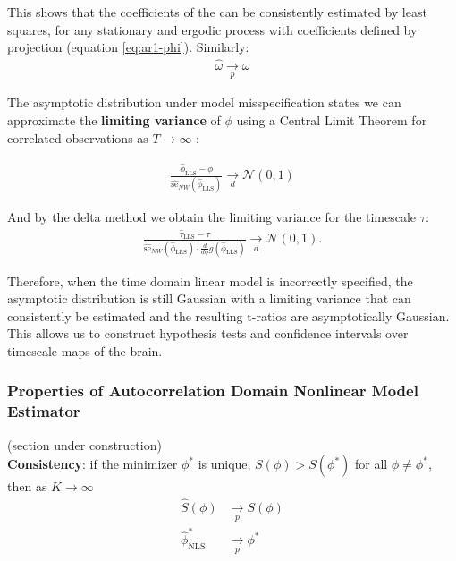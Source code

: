 \documentclass[main.tex]{subfiles}
\begin{document}
\noindent This shows that the coefficients of the  can be consistently estimated by least squares, for any stationary and ergodic process with coefficients defined by projection (equation \eqref{eq:ar1-phi}). Similarly:
\begin{align*}
    \hat \omega \underset{p}{\to} \omega
\end{align*}

The asymptotic distribution under model misspecification states we can approximate the \textbf{limiting variance} of $\phi$ using a Central Limit Theorem for correlated observations as $T\to\infty$ \citet[theorem~14.33]{hansen_econometrics_2022}:

\begin{align*} \label{eq:ar1-phi-clt}
\frac{\hat\phi_{\scriptscriptstyle\text{LLS}} - \phi}{\widehat{\text{se}}_{NW}(\hat\phi_{\scriptscriptstyle\text{LLS}})} \underset{d}{\to} \mathcal{N}(0, 1)
\end{align*}

\noindent And by the delta method we obtain the limiting variance for the timescale $\tau$:
\begin{align*}
    \frac{\hat{\tau}_{\scriptscriptstyle\text{LLS}} - \tau}{\widehat{\text{se}}_{NW}(\hat{\phi}_{\scriptscriptstyle\text{LLS}}) \cdot \frac{d}{d\phi} g(\hat \phi_{\scriptscriptstyle\text{LLS}})} \underset{d}{\to} \mathcal{N}(0,1).
\end{align*}

Therefore, when the time domain linear model is incorrectly specified, the asymptotic distribution is still Gaussian with a limiting variance that can consistently be estimated and the resulting t-ratios are asymptotically Gaussian. This allows us to construct hypothesis tests and confidence intervals over timescale maps of the brain.


\subsubsection{Properties of Autocorrelation Domain Nonlinear Model Estimator}
(section under construction)\\

\textbf{Consistency}: if the minimizer $\phi^*$ is unique, $S(\phi) > S(\phi^*)$ for all $\phi \ne \phi^*$, then as $K\to\infty$
\begin{align}
\hat S(\phi) &\underset{p}{\to} S(\phi)\\
\hat \phi^*_{\scriptscriptstyle\text{NLS}} &\underset{p}{\to} \phi^*
\end{align}
\end{document}
